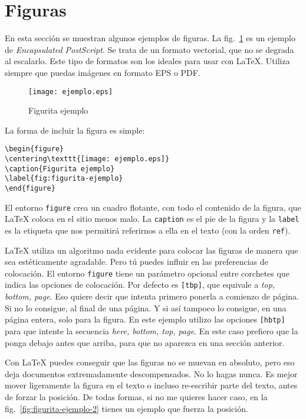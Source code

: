\section{Figuras}
\label{sec:figuras}

En esta sección se muestran algunos ejemplos de figuras.  La fig.~\ref{fig:figurita-ejemplo} es un ejemplo de \emph{Encapsulated PostScript}.  Se trata de un formato vectorial, que no se degrada al escalarlo.  Este tipo de formatos son los ideales para usar con \LaTeX{}.  Utiliza siempre que puedas imágenes en formato EPS o PDF.

\begin{figure}[hbtp]
\centering
\texttt{[image: ejemplo.eps]}
\caption{Figurita ejemplo}
\label{fig:figurita-ejemplo}
\end{figure}

La forma de incluir la figura es simple:

\begin{lstlisting}[language={[LaTeX]TeX},frame=none,numbers=none]
\begin{figure}
\centering\texttt{[image: ejemplo.eps]}
\caption{Figurita ejemplo}
\label{fig:figurita-ejemplo}
\end{figure}
\end{lstlisting}

El entorno \texttt{figure} crea un cuadro flotante, con todo el contenido de la figura, que \LaTeX{} coloca en el sitio menos malo.  La \texttt{caption} es el pie de la figura y la \texttt{label} es la etiqueta que nos permitirá referirnos a ella en el texto (con la orden \texttt{ref}).

\LaTeX{} utiliza un algoritmo nada evidente para colocar las figuras de manera que sea estéticamente agradable.  Pero tú puedes influir en las preferencias de colocación.  El entorno \texttt{figure} tiene un parámetro opcional entre corchetes que indica las opciones de colocación.  Por defecto es \texttt{[tbp]}, que equivale a \emph{top, bottom, page}.  Eso quiere decir que intenta primero ponerla a comienzo de página.  Si no lo consigue, al final de una página.  Y si así tampoco lo consigue, en una página entera, solo para la figura.  En este ejemplo utilizo las opciones \texttt{[hbtp]} para que intente la secuencia \emph{here, bottom, top, page}.  En este caso prefiero que la ponga debajo antes que arriba, para que no aparezca en una sección anterior.

Con \LaTeX{} puedes conseguir que las figuras no se muevan en absoluto, pero eso deja documentos extremadamente descompensados.  No lo hagas nunca.  Es mejor mover ligeramente la figura en el texto o incluso re-escribir parte del texto, antes de forzar la posición.  De todas formas, si no me quieres hacer caso, en la fig.~\ref{fig:figurita-ejemplo-2}  tienes un ejemplo que fuerza la posición.

